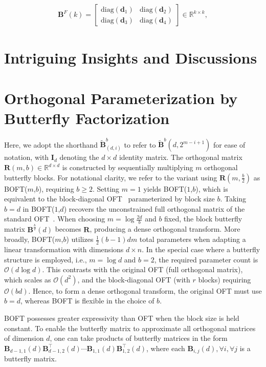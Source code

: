 \begin{equation}\label{eq:but_factor}
\begin{aligned}
    \bm{B}^F(k)=\begin{bmatrix}
    \text{diag}(\bm{d}_1) & \text{diag}(\bm{d}_2) \\
    \text{diag}(\bm{d}_3) & \text{diag}(\bm{d}_4)
    \end{bmatrix}\in\mathbb{R}^{k\times k},
\end{aligned}
\end{equation}

\section{Intriguing Insights and Discussions}

\section{Orthogonal Parameterization by Butterfly Factorization}

Here, we adopt the shorthand $\tilde{\bm{B}}^b_{(d,i)}$ to refer to $\tilde{\bm{B}}^b(d,2^{m - i+1})$ for ease of notation, with $\bm{I}_d$ denoting the $d \times d$ identity matrix. The orthogonal matrix $\bm{R}(m,b)\in\mathbb{R}^{d\times d}$ is constructed by sequentially multiplying $m$ orthogonal butterfly blocks. For notational clarity, we refer to the variant using $\bm{R}(m,\frac{b}{2})$ as BOFT($m$,$b$), requiring $b\geq 2$. Setting $m=1$ yields BOFT($1$,$b$), which is equivalent to the block-diagonal OFT~\cite{qiu2023controlling} parameterized by block size $b$. Taking $b=d$ in BOFT($1$,$d$) recovers the unconstrained full orthogonal matrix of the standard OFT~\cite{qiu2023controlling}. When choosing $m=\log \frac{2d}{b}$ and $b$ fixed, the block butterfly matrix $\bm{B}^{\frac{b}{2}}(d)$ becomes $\bm{R}$, producing a dense orthogonal transform. More broadly, BOFT($m$,$b$) utilizes $\frac{1}{2}(b-1)dm$ total parameters when adapting a linear transformation with dimensions $d\times n$. In the special case where a butterfly structure is employed, i.e., $m=\log d$ and $b=2$, the required parameter count is $\mathcal{O}(d\log d)$. This contrasts with the original OFT (full orthogonal matrix), which scales as $\mathcal{O}(d^2)$, and the block-diagonal OFT (with $r$ blocks) requiring $\mathcal{O}(bd)$. Hence, to form a dense orthogonal transform, the original OFT must use $b=d$, whereas BOFT is flexible in the choice of $b$.

\begin{theorem}\label{thm:exp_boft}
    BOFT possesses greater expressivity than OFT when the block size is held constant. To enable the butterfly matrix to approximate all orthogonal matrices of dimension $d$, one can take products of butterfly matrices in the form $\bm{B}_{d-1,1}(d)\bm{B}^\top_{d-1,2}(d)\cdots\bm{B}_{1,1}(d)\bm{B}^\top_{1,2}(d)$, where each $\bm{B}_{i,j}(d),\forall i,\forall j$ is a butterfly matrix.
\end{theorem}

